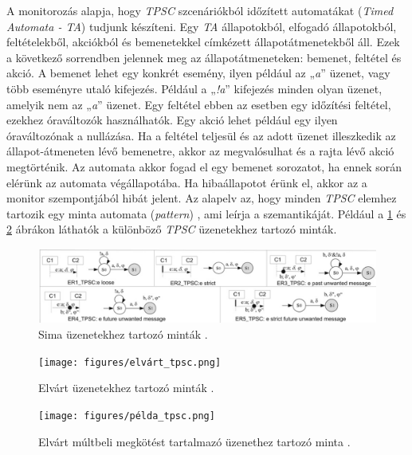 A monitorozás alapja, hogy \textit{TPSC} szcenáriókból időzített automatákat (\textit{Timed Automata - TA}) tudjunk készíteni.
Egy \textit{TA} állapotokból, elfogadó állapotokból, feltételekből, akciókból és bemenetekkel címkézett állapotátmenetekből áll.
Ezek a következő sorrendben jelennek meg az állapotátmeneteken: bemenet, feltétel és akció.
A bemenet lehet egy konkrét esemény, ilyen például az „\textit{a}” üzenet, vagy több eseményre utaló kifejezés.
Például a „\textit{!a}” kifejezés minden olyan üzenet, amelyik nem az „\textit{a}” üzenet.
Egy feltétel ebben az esetben egy időzítési feltétel, ezekhez óraváltozók használhatók.
Egy akció lehet például egy ilyen óraváltozónak a nullázása.
Ha a feltétel teljesül és az adott üzenet illeszkedik az állapot-átmeneten lévő bemenetre, akkor az megvalósulhat és a rajta lévő akció megtörténik.
Az automata akkor fogad el egy bemenet sorozatot, ha ennek során elérünk az automata végállapotába.
Ha hibaállapotot érünk el, akkor az a monitor szempontjából hibát jelent.
Az alapelv az, hogy minden \textit{TPSC} elemhez tartozik egy minta automata (\textit{pattern}) \cite{TPSC1}, ami leírja a szemantikáját.
Például a \ref{tpsc_sima} és \ref{tpsc_elvárt} ábrákon láthatók a különböző \textit{TPSC} üzenetekhez tartozó minták.

\begin{figure}[!ht]
    \centering
    \includegraphics[width=150mm, keepaspectratio]{figures/sima_tpsc.png}
    \caption{Sima üzenetekhez tartozó minták \cite{TPSC1}.}
    \label{tpsc_sima}
\end{figure}

\begin{figure}[!ht]
    \centering
    \texttt{[image: figures/elvárt\_tpsc.png]}
    \caption{Elvárt üzenetekhez tartozó minták \cite{TPSC1}.}
    \label{tpsc_elvárt}
\end{figure}

\begin{figure}[!ht]
    \centering
    \texttt{[image: figures/példa\_tpsc.png]}
    \caption{Elvárt múltbeli megkötést tartalmazó üzenethez tartozó minta \cite{TPSC1}.}
    \label{tpsc_példa}
\end{figure}

